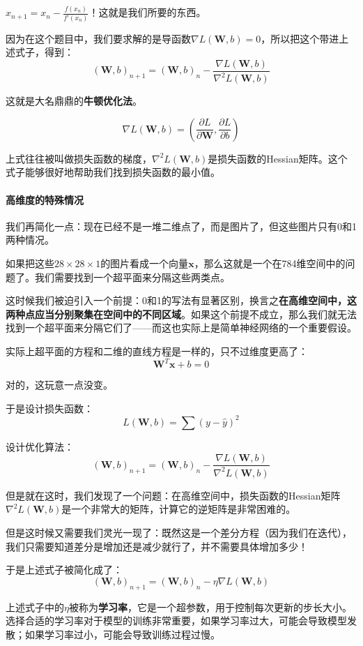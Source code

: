 \documentclass[fontset=none]{ctexart}
\begin{document}
$x_{n+1} = x_n - \frac{f(x_n)}{f'(x_n)}$！这就是我们所要的东西。

因为在这个题目中，我们要求解的是导函数$\nabla L(\mathbf{W}, b) = 0$，所以把这个带进上述式子，得到：
\[(\mathbf{W}, b)_{n+1} = (\mathbf{W}, b)_n - \frac{\nabla L(\mathbf{W}, b)}{\nabla^2 L(\mathbf{W}, b)}\]

这就是大名鼎鼎的\textbf{牛顿优化法}。

\[\nabla L(\mathbf{W}, b) = \left( \frac{\partial L}{\partial \mathbf{W}}, \frac{\partial L}{\partial b} \right)\]

上式往往被叫做损失函数的梯度，$\nabla^2 L(\mathbf{W}, b)$是损失函数的Hessian矩阵。这个式子能够很好地帮助我们找到损失函数的最小值。

\paragraph{高维度的特殊情况}

我们再简化一点：现在已经不是一堆二维点了，而是图片了，但这些图片只有0和1两种情况。

如果把这些$28 \times 28 \times 1$的图片看成一个向量$\mathbf{x}$，那么这就是一个在784维空间中的问题了。我们需要找到一个超平面来分隔这些两类点。

这时候我们被迫引入一个前提：0和1的写法有显著区别，换言之\textbf{在高维空间中，这两种点应当分别聚集在空间中的不同区域}。如果这个前提不成立，那么我们就无法找到一个超平面来分隔它们了——而这也实际上是简单神经网络的一个重要假设。

实际上超平面的方程和二维的直线方程是一样的，只不过维度更高了：
\[\mathbf{W}^T\mathbf{x} + b = 0\]

对的，这玩意一点没变。

于是设计损失函数：
\[L(\mathbf{W}, b) = \sum (y - \hat{y})^2\]

设计优化算法：
\[(\mathbf{W}, b)_{n+1} = (\mathbf{W}, b)_n - \frac{\nabla L(\mathbf{W}, b)}{\nabla^2 L(\mathbf{W}, b)}\]

但是就在这时，我们发现了一个问题：在高维空间中，损失函数的Hessian矩阵$\nabla^2 L(\mathbf{W}, b)$是一个非常大的矩阵，计算它的逆矩阵是非常困难的。

但是这时候又需要我们灵光一现了：既然这是一个差分方程（因为我们在迭代），我们只需要知道差分是增加还是减少就行了，并不需要具体增加多少！

于是上述式子被简化成了：
\[(\mathbf{W}, b)_{n+1} = (\mathbf{W}, b)_n - \eta \nabla L(\mathbf{W}, b)\]

上述式子中的$\eta$被称为\textbf{学习率}，它是一个超参数，用于控制每次更新的步长大小。选择合适的学习率对于模型的训练非常重要，如果学习率过大，可能会导致模型发散；如果学习率过小，可能会导致训练过程过慢。
\end{document}
